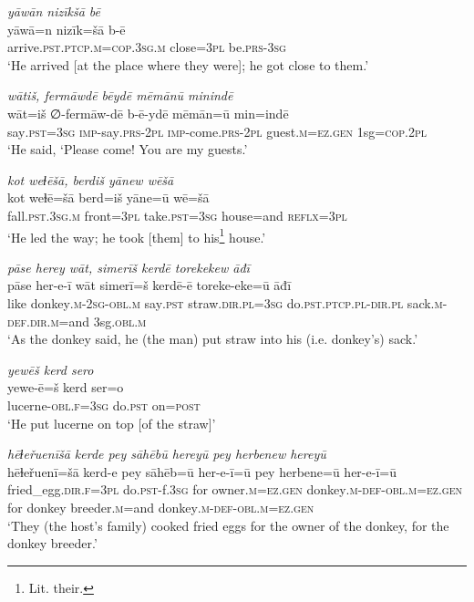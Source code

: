\ea \label{HB.50}
\textit{yāwān nizīkšā bē} \\ 
\gll yāwā=n nizīk=šā b-ē \\ 
 arrive\textsc{.pst}\textsc{.ptcp}\textsc{.m}\textsc{=cop}\textsc{.3sg}\textsc{.m} close\textsc{=3pl} be\textsc{.prs}\textsc{-3sg} \\ 
\glt `He arrived [at the place where they were]; he got close to them.'
\z 
 
\ea \label{HB.51}
\textit{wātiš, fermāwdē bēydē mēmānū minindē} \\ 
\gll wāt=iš ∅-fermāw-dē b-ē-ydē mēmān=ū min=indē \\ 
 say\textsc{.pst}\textsc{=3sg} \textsc{imp-}say\textsc{.prs}\textsc{-2pl} \textsc{imp-}come\textsc{.prs}\textsc{-2pl} guest\textsc{.m}\textsc{=ez}\textsc{.gen} 1sg\textsc{=cop}\textsc{.2pl} \\ 
\glt `He said, ‘Please come! You are my guests.'
\z 
 
\ea \label{HB.53}
\textit{kot weɫēšā, berdiš yānew wēšā} \\ 
\gll kot weɫē=šā berd=iš yāne=ū wē=šā \\ 
 fall\textsc{.pst}\textsc{.3sg}\textsc{.m} front\textsc{=3pl} take\textsc{.pst}\textsc{=3sg} house=and \textsc{reflx}\textsc{=3pl} \\ 
\glt `He led the way; he took [them] to his\footnote{Lit. their.} house.'
\z 
 
\ea \label{HB.54}
\textit{pāse herey wāt, simerīš kerdē torekekew āđī} \\ 
\gll pāse her-e-ī wāt simerī=š kerdē-ē toreke-eke=ū āđī \\ 
 like donkey\textsc{.m}-\textsc{2sg}\textsc{-obl}\textsc{.m} say\textsc{.pst} straw\textsc{.dir}\textsc{.pl}\textsc{=3sg} do\textsc{.pst}\textsc{.ptcp}\textsc{.pl}\textsc{-dir}\textsc{.pl} sack\textsc{.m}\textsc{-def}\textsc{.dir}\textsc{.m}=and 3sg\textsc{.obl}\textsc{.m} \\ 
\glt `As the donkey said, he (the man) put straw into his (i.e. donkey’s) sack.'
\z 
 
\ea \label{HB.55}
\textit{yewēš kerd sero} \\ 
\gll yewe-ē=š kerd ser=o \\ 
 lucerne\textsc{-obl}\textsc{\textsc{.f}}\textsc{=3sg} do\textsc{.pst} on\textsc{=\textsc{post}} \\ 
\glt `He put lucerne on top [of the straw]'
\z 
 
\ea \label{HB.56}
\textit{hēɫeřuenīšā kerde pey sāhēbū hereyū pey herbenew hereyū} \\ 
\gll hēɫeřuenī=šā kerd-e pey sāhēb=ū her-e-ī=ū pey herbene=ū her-e-ī=ū \\ 
 fried\_egg\textsc{.dir}\textsc{\textsc{.f}}\textsc{=3pl} do\textsc{.pst}-f\textsc{.3sg} for owner\textsc{.m}\textsc{=ez}\textsc{.gen} donkey\textsc{.m}\textsc{-def}\textsc{-obl}\textsc{.m}\textsc{=ez}\textsc{.gen} for donkey breeder\textsc{.m}=and donkey\textsc{.m}\textsc{-def}\textsc{-obl}\textsc{.m}\textsc{=ez}\textsc{.gen} \\ 
\glt `They (the host’s family) cooked fried eggs for the owner of the donkey, for the donkey breeder.'
\z 
 
